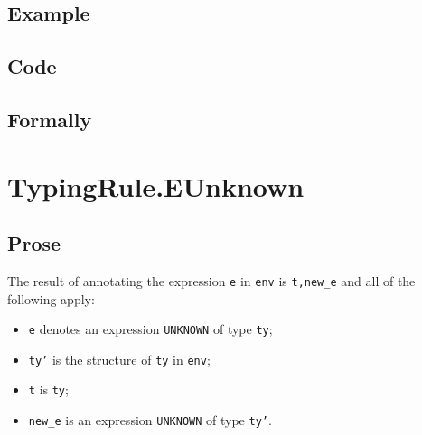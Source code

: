 \documentclass{book}
\newcommand\annotateexpr[1]{\textsf{annotate\_expr}(#1)}
\newcommand\tenv[0]{\texttt{env}}
\newcommand\vt[0]{\texttt{t}}
\begin{document}
  \subsection{Example}

  \subsection{Code}

\begin{emptyformal}
    \subsection{Formally}
\end{emptyformal}


\section{TypingRule.EUnknown \label{sec:TypingRule.EUnknown}}

  \subsection{Prose}
  The result of annotating the expression \texttt{e} in \texttt{env} is
\texttt{t,new\_e} and all of the following apply:
  \begin{itemize}
  \item \texttt{e} denotes an expression \texttt{UNKNOWN} of type \texttt{ty};
  \item \texttt{ty'} is the structure of \texttt{ty} in \texttt{env};
  \item \texttt{t} is \texttt{ty};
  \item \texttt{new\_e} is an expression \texttt{UNKNOWN} of type \texttt{ty'}.
  \end{itemize}
\end{document}
